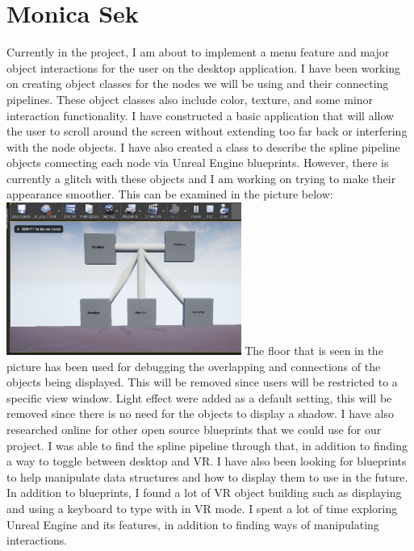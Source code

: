 \documentclass[onecolumn, draftclsnofoot, 10pt, compsoc]{IEEEtran}
\begin{document}
\section{Monica Sek}
\begin{singlespace}
Currently in the project, I am about to implement a menu feature and major object interactions for the user on the desktop application. I have been working on creating object classes for the nodes we will be using and their connecting pipelines. These object classes also include color, texture, and some minor interaction functionality. I have constructed a basic application that will allow the user to scroll around the screen without extending too far back or interfering with the node objects. I have also created a class to describe the spline pipeline objects connecting each node via Unreal Engine blueprints. However, there is currently a glitch with these objects and I am working on trying to make their appearance smoother. This can be examined in the picture below:\\
\newline
\includegraphics[height=5cm]{tree}
\newline
The floor that is seen in the picture has been used for debugging the overlapping and connections of the objects being displayed. This will be removed since users will be restricted to a specific view window. Light effect were added as a default setting, this will be removed since there is no need for the objects to display a shadow. 
I have also researched online for other open source blueprints that we could use for our project. I was able to find the spline pipeline through that, in addition to finding a way to toggle between desktop and VR. I have also been looking for blueprints to help manipulate data structures and how to display them to use in the future. In addition to blueprints, I found a lot of VR object building such as displaying and using a keyboard to type with in VR mode. I spent a lot of time exploring Unreal Engine and its features, in addition to finding ways of manipulating interactions. 

\end{singlespace}
\end{document}
